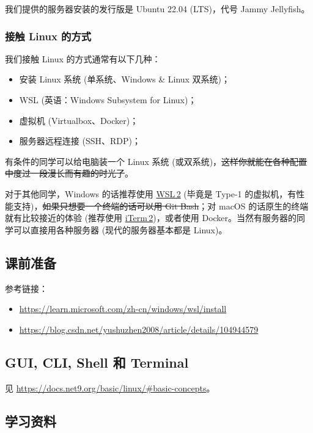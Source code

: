 \documentclass{article}
\begin{document}
	我们提供的服务器安装的发行版是 Ubuntu 22.04 (LTS)，代号 Jammy Jellyfish。

	\subsubsection{接触 Linux 的方式}

	我们接触 Linux 的方式通常有以下几种：\cite{net9-linux}

	\begin{itemize}
		\itemsep0pt
		\item 安装 Linux 系统 (单系统、Windows \& Linux 双系统)；
		\item WSL (英语：Windows Subsystem for Linux)；
		\item 虚拟机 (Virtualbox、Docker)；
		\item 服务器远程连接 (SSH、RDP)；
	\end{itemize}

	有条件的同学可以给电脑装一个 Linux 系统 (或双系统)，\sout{这样你就能在各种配置中度过一段漫长而有趣的时光了}。

	对于其他同学，Windows 的话推荐使用 \href{https://learn.microsoft.com/zh-cn/windows/wsl/install}{WSL\,2} (毕竟是 Type-1 的虚拟机，有性能支持)，\sout{如果只想要一个终端的话}\linebreak[1]\sout{可以用 Git Bash}；对 macOS 的话原生的终端就有比较接近的体验 (推荐使用 \href{https://iterm2.com/}{iTerm\,2})，或者使用 Docker。当然有服务器的同学可以直接用各种服务器 (现代的服务器基本都是 Linux)。

	\subsection{课前准备}

	参考链接：
	\begin{itemize}
		\itemsep0pt
		\item \url{https://learn.microsoft.com/zh-cn/windows/wsl/install}
		\item \url{https://blog.csdn.net/yushuzhen2008/article/details/104944579}
	\end{itemize}

	\subsection{GUI, CLI, Shell 和 Terminal}

	见 \url{https://docs.net9.org/basic/linux/#basic-concepts}。

	\subsection{学习资料}
\end{document}
